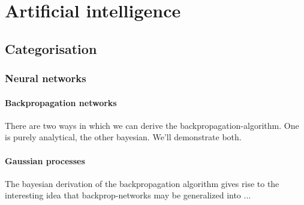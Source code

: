 \section{Artificial intelligence}

\subsection{Categorisation}

\subsubsection{Neural networks}

\paragraph{Backpropagation networks}

There are two ways in which we can derive the backpropagation-algorithm. One is purely analytical, the other bayesian. We'll demonstrate both. 

\paragraph{Gaussian processes}

The bayesian derivation of the backpropagation algorithm gives rise to the interesting idea that backprop-networks may be generalized into ...